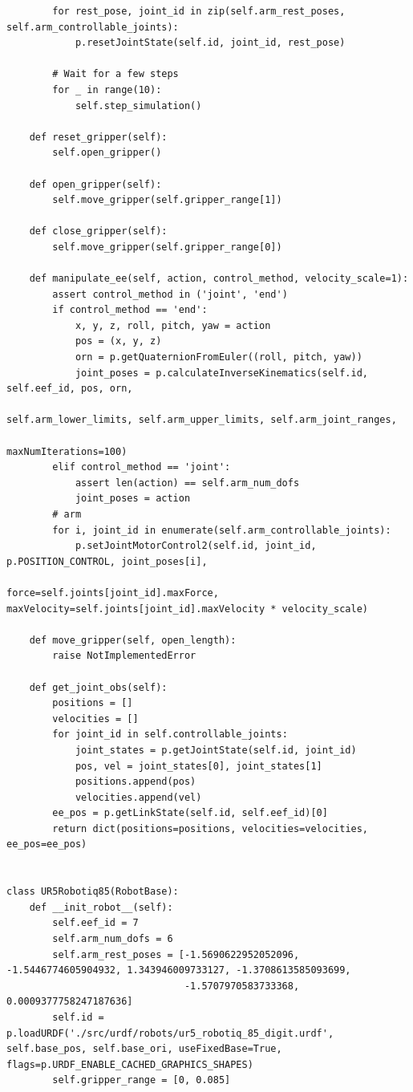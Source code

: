 \documentclass[11pt, a4paper]{report}
\begin{document}
\begin{lstlisting}
        for rest_pose, joint_id in zip(self.arm_rest_poses, self.arm_controllable_joints):
            p.resetJointState(self.id, joint_id, rest_pose)

        # Wait for a few steps
        for _ in range(10):
            self.step_simulation()

    def reset_gripper(self):
        self.open_gripper()

    def open_gripper(self):
        self.move_gripper(self.gripper_range[1])

    def close_gripper(self):
        self.move_gripper(self.gripper_range[0])

    def manipulate_ee(self, action, control_method, velocity_scale=1):
        assert control_method in ('joint', 'end')
        if control_method == 'end':
            x, y, z, roll, pitch, yaw = action
            pos = (x, y, z)
            orn = p.getQuaternionFromEuler((roll, pitch, yaw))
            joint_poses = p.calculateInverseKinematics(self.id, self.eef_id, pos, orn,
                                                       self.arm_lower_limits, self.arm_upper_limits, self.arm_joint_ranges,
                                                       maxNumIterations=100)
        elif control_method == 'joint':
            assert len(action) == self.arm_num_dofs
            joint_poses = action
        # arm
        for i, joint_id in enumerate(self.arm_controllable_joints):
            p.setJointMotorControl2(self.id, joint_id, p.POSITION_CONTROL, joint_poses[i],
                                    force=self.joints[joint_id].maxForce, maxVelocity=self.joints[joint_id].maxVelocity * velocity_scale)

    def move_gripper(self, open_length):
        raise NotImplementedError

    def get_joint_obs(self):
        positions = []
        velocities = []
        for joint_id in self.controllable_joints:
            joint_states = p.getJointState(self.id, joint_id)
            pos, vel = joint_states[0], joint_states[1]
            positions.append(pos)
            velocities.append(vel)
        ee_pos = p.getLinkState(self.id, self.eef_id)[0]
        return dict(positions=positions, velocities=velocities, ee_pos=ee_pos)


class UR5Robotiq85(RobotBase):
    def __init_robot__(self):
        self.eef_id = 7
        self.arm_num_dofs = 6
        self.arm_rest_poses = [-1.5690622952052096, -1.5446774605904932, 1.343946009733127, -1.3708613585093699,
                               -1.5707970583733368, 0.0009377758247187636]
        self.id = p.loadURDF('./src/urdf/robots/ur5_robotiq_85_digit.urdf', self.base_pos, self.base_ori, useFixedBase=True, flags=p.URDF_ENABLE_CACHED_GRAPHICS_SHAPES)
        self.gripper_range = [0, 0.085]
    

\end{lstlisting}
\end{document}
